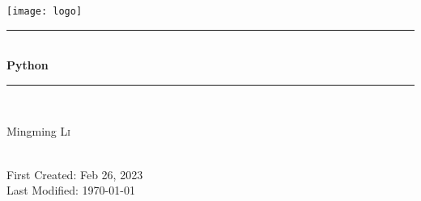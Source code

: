 \newcommand{\mytitle}{Python}
\newcommand{\firstcreated}{Feb 26, 2023}

\begin{titlepage}

\newcommand{\HRule}{\rule{\linewidth}{0.5mm}} %

\center                         %
 

\texttt{[image: logo]}\\[1cm] %


\HRule\\[0.4cm]
{ \huge \bfseries \mytitle}\\[0.4cm] %
\HRule\\[1.5cm]
 

\begin{minipage}{0.4\textwidth}
\begin{center} \large
Mingming \textsc{Li}\\ %
\end{center}

\end{minipage}\\[2cm]


\vfill
{\large First Created: \firstcreated}\\
{\large Last Modified: \today}\\[2cm] %



\end{titlepage}

